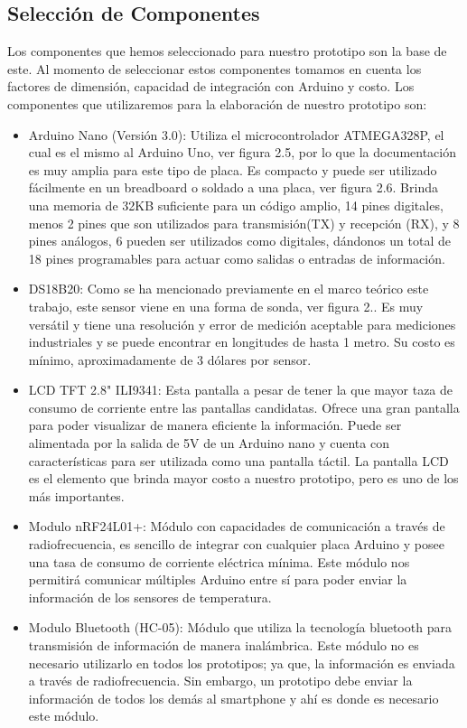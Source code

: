 \subsection{Selección de Componentes}
\par 
Los componentes que hemos seleccionado para nuestro prototipo son la base de este. Al momento de seleccionar estos componentes tomamos en cuenta los factores de dimensión, capacidad de integración con Arduino y costo. Los componentes que utilizaremos para la elaboración de nuestro prototipo son:

\begin{itemize}
	\item Arduino Nano (Versión 3.0): Utiliza el microcontrolador ATMEGA328P, el cual es el mismo al Arduino Uno, ver figura 2.5, por lo que la documentación es muy amplia para este tipo de placa. Es compacto y puede ser utilizado fácilmente en un breadboard o soldado a una placa, ver figura 2.6. Brinda una memoria de 32KB suficiente para un código amplio, 14 pines digitales, menos 2 pines que son utilizados para transmisión(TX) y recepción (RX), y 8 pines análogos, 6 pueden ser utilizados como digitales, dándonos un total de 18 pines programables para actuar como salidas o entradas de información.
	
	\item DS18B20: Como se ha mencionado previamente en el marco teórico este trabajo, este sensor viene en una forma de sonda, ver figura 2.. Es muy versátil y tiene una resolución y error de medición aceptable para mediciones industriales y se puede encontrar en longitudes de hasta 1 metro. Su costo es mínimo, aproximadamente de 3 dólares por sensor. 
	
	\item LCD TFT 2.8" ILI9341: Esta pantalla a pesar de tener la que mayor taza de consumo de corriente entre las pantallas candidatas. Ofrece una gran pantalla para poder visualizar de manera eficiente la información. Puede ser alimentada por la salida de 5V de un Arduino nano y cuenta con características para ser utilizada como una pantalla táctil. La pantalla LCD es el elemento que brinda mayor costo a nuestro prototipo, pero es uno de los más importantes.
	
	\item Modulo nRF24L01+: Módulo con capacidades de comunicación a través de radiofrecuencia, es sencillo de integrar con cualquier placa Arduino y posee una tasa de consumo de corriente eléctrica mínima. Este módulo nos permitirá comunicar múltiples Arduino entre sí para poder enviar la información de los sensores de temperatura.
	
	\item Modulo Bluetooth (HC-05): Módulo que utiliza la tecnología bluetooth para transmisión de información de manera inalámbrica. Este módulo no es necesario utilizarlo en todos los prototipos; ya que, la información es enviada a través de radiofrecuencia. Sin embargo, un prototipo debe enviar la información de todos los demás al smartphone y ahí es donde es necesario este módulo. 
	
\end{itemize}

